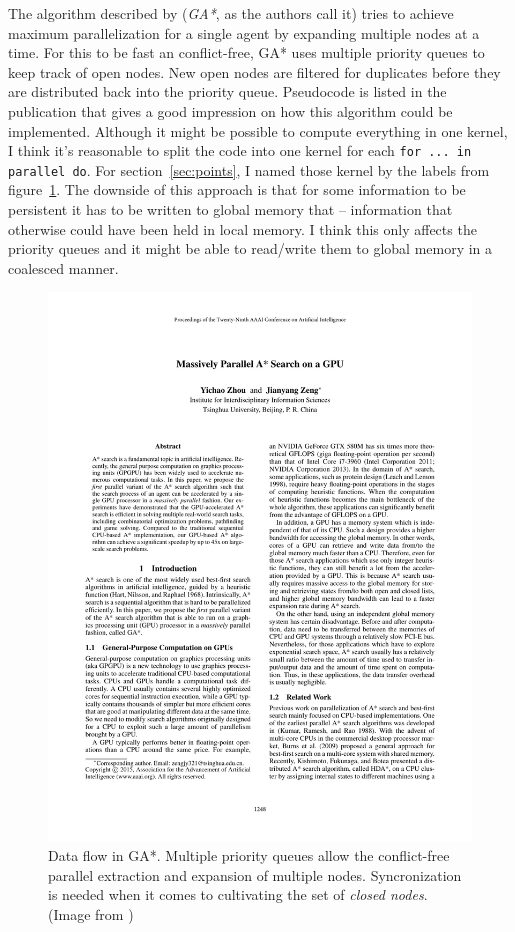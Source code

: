 \documentclass[
    paper = a4,
    twocolumn = true,
    DIV = calc
]{scrartcl}
\newcommand{\GA}{GA*}
\begin{document}
The algorithm described by \cite{zhou2015massively} (\emph{\GA{}}, as the authors call it) tries to achieve maximum parallelization for a single agent by expanding multiple nodes at a time. For this to be fast an conflict-free, \GA{} uses multiple priority queues to keep track of open nodes. New open nodes are filtered for duplicates before they are distributed back into the priority queue. Pseudocode is listed in the publication that gives a good impression on how this algorithm could be implemented. Although it might be possible to compute everything in one kernel, I think it's reasonable to split the code into one kernel for each \texttt{for ... in parallel do}. For section~\ref{sec:points}, I named those kernel by the labels from figure~\ref{fig:dataflow}. The downside of this approach is that for some information to be persistent it has to be written to global memory that -- information that otherwise could have been held in local memory. I think this only affects the priority queues and it might be able to read/write them to global memory in a coalesced manner.

\begin{figure}
    \includegraphics[page=3, trim=318 480 52 55, clip, width=\columnwidth]{zhou2015massively}
    \caption{Data flow in \GA{}. Multiple priority queues allow the conflict-free parallel extraction and expansion of multiple nodes. Syncronization is needed when it comes to cultivating the set of \emph{closed nodes}. (Image from \cite{zhou2015massively})}
    \label{fig:dataflow}
\end{figure}
\end{document}
